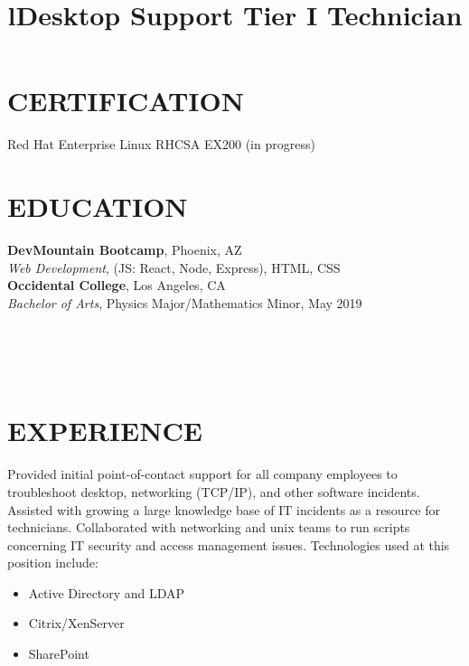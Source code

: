 \documentclass[margin]{res}
\begin{document}
\begin{resume}

	\section{CERTIFICATION}
	Red Hat Enterprise Linux RHCSA EX200 (in progress)

\section{EDUCATION}
\textbf{DevMountain Bootcamp}, Phoenix, AZ\\
{\sl Web Development}, (JS: React, Node, Express), HTML, CSS\\
\textbf{Occidental College}, Los Angeles, CA\\
{\sl Bachelor of Arts}, Physics Major/Mathematics Minor, May 2019\hfill 


\begin{format}
\title{l}\\
\\
\body\\
\end{format}

\section{EXPERIENCE}
\title{\textbf{Desktop Support Tier I Technician}}
\begin{position}
	Provided initial point-of-contact support for all company employees to troubleshoot desktop, networking (TCP/IP), and other software incidents. Assisted with growing a large knowledge base of IT incidents as a resource for technicians. Collaborated with networking and unix teams to run scripts concerning IT security and access management issues. Technologies used at this position include:
	\begin{itemize}
		\item Active Directory and LDAP
		\item Citrix/XenServer
		\item SharePoint
	\end{itemize}
\end{position}


\end{resume}
\end{document}
